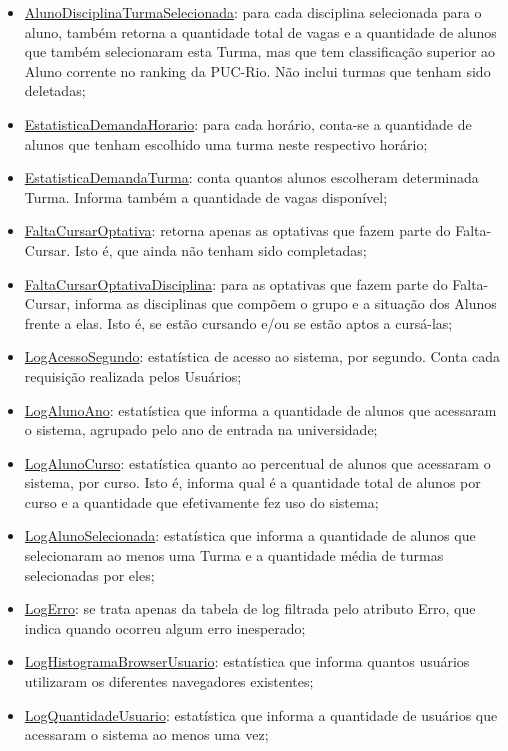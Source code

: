 \documentclass[graduacao,brazil]{ThesisPUC}
\begin{document}
\begin{itemize}
	\item \underline{AlunoDisciplinaTurmaSelecionada}: para cada disciplina selecionada para o aluno, também retorna a quantidade total de vagas e a quantidade de alunos que também selecionaram esta Turma, mas que tem classificação superior ao Aluno corrente no ranking da PUC-Rio. Não inclui turmas que tenham sido deletadas;
	\item \underline{EstatisticaDemandaHorario}: para cada horário, conta-se a quantidade de alunos que tenham escolhido uma turma neste respectivo horário;
	\item \underline{EstatisticaDemandaTurma}: conta quantos alunos escolheram determinada Turma. Informa também a quantidade de vagas disponível;
	\item \underline{FaltaCursarOptativa}: retorna apenas as optativas que fazem parte do Falta-Cursar. Isto é, que ainda não tenham sido completadas;
	\item \underline{FaltaCursarOptativaDisciplina}: para as optativas que fazem parte do Falta-Cursar, informa as disciplinas que compõem o grupo e a situação dos Alunos frente a elas. Isto é, se estão cursando e/ou se estão aptos a cursá-las;
	\item \underline{LogAcessoSegundo}: estatística de acesso ao sistema, por segundo. Conta cada requisição realizada pelos Usuários;
	\item \underline{LogAlunoAno}: estatística que informa a quantidade de alunos que acessaram o sistema, agrupado pelo ano de entrada na universidade;
	\item \underline{LogAlunoCurso}: estatística quanto ao percentual de alunos que acessaram o sistema, por curso. Isto é, informa qual é a quantidade total de alunos por curso e a quantidade que efetivamente fez uso do sistema;
	\item \underline{LogAlunoSelecionada}: estatística que informa a quantidade de alunos que selecionaram ao menos uma Turma e a quantidade média de turmas selecionadas por eles;
	\item \underline{LogErro}: se trata apenas da tabela de log filtrada pelo atributo Erro, que indica quando ocorreu algum erro inesperado;
	\item \underline{LogHistogramaBrowserUsuario}: estatística que informa quantos usuários utilizaram os diferentes navegadores existentes;
	\item \underline{LogQuantidadeUsuario}: estatística que informa a quantidade de usuários que acessaram o sistema ao menos uma vez;

\end{itemize}
\end{document}
